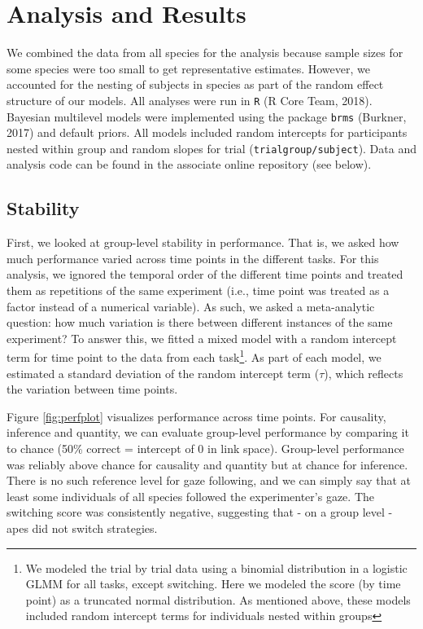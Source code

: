 \documentclass[10pt, letterpaper]{article}
\begin{document}
\hypertarget{analysis-and-results}{%
\section{Analysis and Results}\label{analysis-and-results}}

We combined the data from all species for the analysis because sample
sizes for some species were too small to get representative estimates.
However, we accounted for the nesting of subjects in species as part of
the random effect structure of our models. All analyses were run in
\texttt{R} (R Core Team, 2018). Bayesian multilevel models were
implemented using the package \texttt{brms} (Burkner, 2017) and default
priors. All models included random intercepts for participants nested
within group and random slopes for trial
(\texttt{trial\textbar{}group/subject}). Data and analysis code can be
found in the associate online repository (see below).

\hypertarget{stability}{%
\subsection{Stability}\label{stability}}

First, we looked at group-level stability in performance. That is, we
asked how much performance varied across time points in the different
tasks. For this analysis, we ignored the temporal order of the different
time points and treated them as repetitions of the same experiment
(i.e., time point was treated as a factor instead of a numerical
variable). As such, we asked a meta-analytic question: how much
variation is there between different instances of the same experiment?
To answer this, we fitted a mixed model with a random intercept term for
time point to the data from each task\footnote{We modeled the trial by
  trial data using a binomial distribution in a logistic GLMM for all
  tasks, except switching. Here we modeled the score (by time point) as
  a truncated normal distribution. As mentioned above, these models
  included random intercept terms for individuals nested within groups}.
As part of each model, we estimated a standard deviation of the random
intercept term (\(\tau\)), which reflects the variation between time
points.

Figure \ref{fig:perfplot} visualizes performance across time points. For
causality, inference and quantity, we can evaluate group-level
performance by comparing it to chance (50\% correct = intercept of 0 in
link space). Group-level performance was reliably above chance for
causality and quantity but at chance for inference. There is no such
reference level for gaze following, and we can simply say that at least
some individuals of all species followed the experimenter's gaze. The
switching score was consistently negative, suggesting that - on a group
level - apes did not switch strategies.
\end{document}
